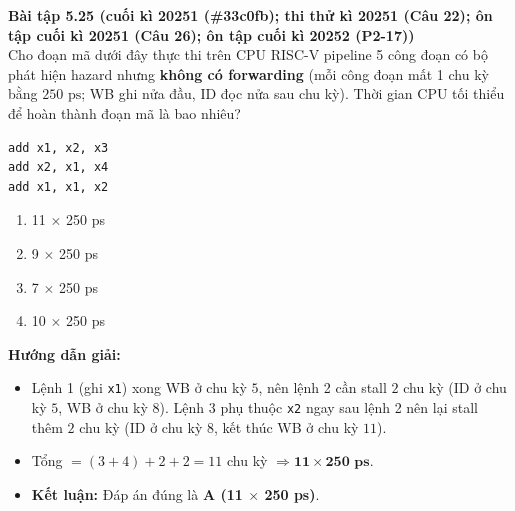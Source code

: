 \textbf{Bài tập 5.25 (cuối kì 20251 (\#33c0fb); thi thử kì 20251 (Câu 22); ôn tập cuối kì 20251 (Câu 26); ôn tập cuối kì 20252 (P2-17))}\\
Cho đoạn mã dưới đây thực thi trên CPU RISC-V pipeline 5 công đoạn có bộ phát hiện hazard nhưng \textbf{không có forwarding} (mỗi công đoạn mất 1 chu kỳ bằng $250\text{ ps}$; WB ghi nửa đầu, ID đọc nửa sau chu kỳ). Thời gian CPU tối thiểu để hoàn thành đoạn mã là bao nhiêu?
\begin{lstlisting}
add x1, x2, x3
add x2, x1, x4
add x1, x1, x2
\end{lstlisting}
\begin{enumerate}[label=\Alph*.]
    \item 11 $\times$ 250 ps
    \item 9 $\times$ 250 ps
    \item 7 $\times$ 250 ps
    \item 10 $\times$ 250 ps
\end{enumerate}
\textbf{Hướng dẫn giải:}
\begin{itemize}
    \item Lệnh 1 (ghi \texttt{x1}) xong WB ở chu kỳ $5$, nên lệnh 2 cần stall $2$ chu kỳ (ID ở chu kỳ $5$, WB ở chu kỳ $8$). Lệnh 3 phụ thuộc \texttt{x2} ngay sau lệnh 2 nên lại stall thêm $2$ chu kỳ (ID ở chu kỳ $8$, kết thúc WB ở chu kỳ $11$).
    \item Tổng $= (3 + 4) + 2 + 2 = 11$ chu kỳ $\Rightarrow \mathbf{11 \times 250\text{ ps}}$.
    \item \textbf{Kết luận:} Đáp án đúng là \textbf{A (11 $\times$ 250 ps)}.
\end{itemize}

